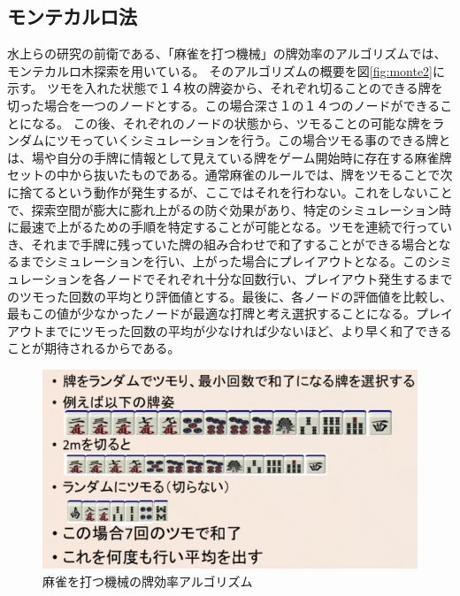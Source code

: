 \subsection{モンテカルロ法}

水上ら\cite{bakuuti}の研究の前衛である、「麻雀を打つ機械」\cite{nmizu}の牌効率のアルゴリズムでは、モンテカルロ木探索を用いている。
そのアルゴリズムの概要を図\ref{fig:monte2}に示す。
ツモを入れた状態で１４枚の牌姿から、それぞれ切ることのできる牌を切った場合を一つのノードとする。この場合深さ１の１４つのノードができることになる。
この後、それぞれのノードの状態から、ツモることの可能な牌をランダムにツモっていくシミュレーションを行う。この場合ツモる事のできる牌とは、場や自分の手牌に情報として見えている牌をゲーム開始時に存在する麻雀牌セットの中から抜いたものである。通常麻雀のルールでは、牌をツモることで次に捨てるという動作が発生するが、ここではそれを行わない。これをしないことで、探索空間が膨大に膨れ上がるの防ぐ効果があり、特定のシミュレーション時に最速で上がるための手順を特定することが可能となる。ツモを連続で行っていき、それまで手牌に残っていた牌の組み合わせで和了することができる場合となるまでシミュレーションを行い、上がった場合にプレイアウトとなる。このシミュレーションを各ノードでそれぞれ十分な回数行い、プレイアウト発生するまでのツモった回数の平均とり評価値とする。最後に、各ノードの評価値を比較し、最もこの値が少なかったノードが最適な打牌と考え選択することになる。プレイアウトまでにツモった回数の平均が少なければ少ないほど、より早く和了できることが期待されるからである。

\begin{figure}[h]
 \centering
 \includegraphics[keepaspectratio, scale=0.25,bb=0 0 808 429]
      {img/monte1.png}
 \caption{麻雀を打つ機械の牌効率アルゴリズム}
 \label{monte1}
\end{figure}

